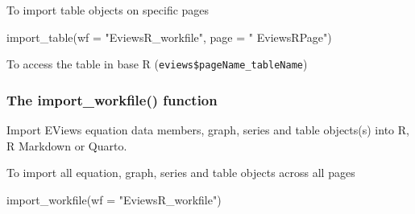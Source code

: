 \documentclass[
  letterpaper,
  DIV=11,
  numbers=noendperiod]{scrartcl}
\newenvironment{Shaded}{\begin{snugshade}}{\end{snugshade}}
\newcommand{\AttributeTok}[1]{\textcolor[rgb]{0.40,0.45,0.13}{#1}}
\newcommand{\FunctionTok}[1]{\textcolor[rgb]{0.28,0.35,0.67}{#1}}
\newcommand{\NormalTok}[1]{\textcolor[rgb]{0.00,0.23,0.31}{#1}}
\newcommand{\SpecialCharTok}[1]{\textcolor[rgb]{0.37,0.37,0.37}{#1}}
\newcommand{\StringTok}[1]{\textcolor[rgb]{0.13,0.47,0.30}{#1}}
\begin{document}
\begin{figure}

\end{figure}

To import table objects on specific pages

\begin{Shaded}
\begin{Highlighting}[]
\FunctionTok{import\_table}\NormalTok{(}\AttributeTok{wf =} \StringTok{"EviewsR\_workfile"}\NormalTok{, }\AttributeTok{page =} \StringTok{" EviewsRPage"}\NormalTok{)}
\end{Highlighting}
\end{Shaded}

\begin{figure}

\end{figure}

To access the table in base R (\texttt{eviews\$pageName\_tableName})

\begin{Shaded}
\end{Shaded}

\begin{figure}

\end{figure}

\hypertarget{the-import_workfile-function}{%
\subsubsection{The import\_workfile()
function}\label{the-import_workfile-function}}

Import EViews equation data members, graph, series and table objects(s)
into R, R Markdown or Quarto.

To import all equation, graph, series and table objects across all pages

\begin{Shaded}
\begin{Highlighting}[]
\FunctionTok{import\_workfile}\NormalTok{(}\AttributeTok{wf =} \StringTok{"EviewsR\_workfile"}\NormalTok{)}
\end{Highlighting}
\end{Shaded}
\end{document}
